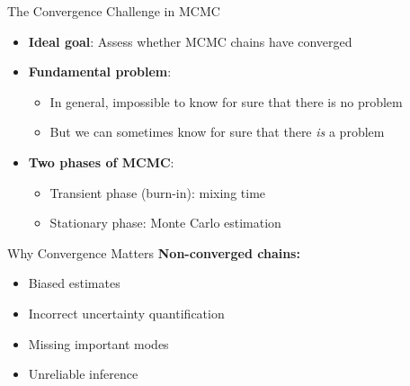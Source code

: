 \begin{frame}{The Convergence Challenge in MCMC}
	\begin{itemize}
		\item \textbf{Ideal goal}: Assess whether MCMC chains have converged
		\item \textbf{Fundamental problem}:
		      \begin{itemize}
			      \item In general, impossible to know for sure that there is no problem
			      \item But we can sometimes know for sure that there \textit{is} a problem
		      \end{itemize}
		\item \textbf{Two phases of MCMC}:
		      \begin{itemize}
			      \item Transient phase (burn-in): mixing time
			      \item Stationary phase: Monte Carlo estimation
		      \end{itemize}
	\end{itemize}

	\vspace{0.5cm}
	\begin{center}
	\end{center}
\end{frame}

\begin{frame}{Why Convergence Matters}
	\textbf{Non-converged chains:}
	\begin{itemize}
		\item Biased estimates
		\item Incorrect uncertainty quantification
		\item Missing important modes
		\item Unreliable inference
	\end{itemize}
\end{frame}

